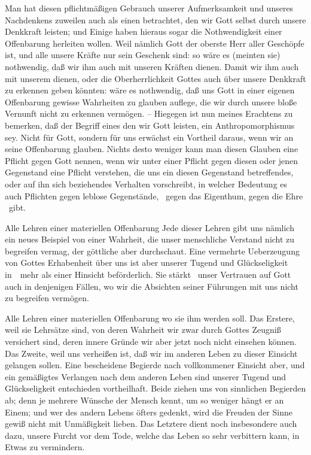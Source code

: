 \begin{aufza}
\begin{RWanm}  Man hat diesen pflichtmäßigen Gebrauch unserer Aufmerksamkeit und unseres Nachdenkens zuweilen auch als einen  betrachtet, den wir Gott selbst durch unsere Denkkraft leisten; und Einige haben hieraus sogar die Nothwendigkeit einer Offenbarung herleiten wollen. Weil nämlich Gott der oberste Herr aller Geschöpfe ist, und alle unsere Kräfte nur sein Geschenk sind: so wäre es (meinten sie) nothwendig, daß wir ihm auch mit  unseren Kräften dienen. Damit wir ihm auch mit unserem  dienen, oder die Oberherrlichkeit Gottes auch über unsere Denkkraft zu erkennen geben könnten: wäre es nothwendig, daß uns Gott in einer eigenen Offenbarung gewisse Wahrheiten zu glauben auflege, die wir durch unsere bloße Vernunft nicht zu erkennen vermögen. -- Hiegegen ist nun meines Erachtens zu bemerken, daß der Begriff eines  den wir Gott leisten, ein Anthropomorphismus sey. Nicht für Gott, sondern für uns erwächst ein Vortheil daraus, wenn wir an seine Offenbarung glauben. Nichts desto weniger kann man diesen Glauben eine Pflicht gegen Gott nennen, wenn wir unter einer Pflicht gegen diesen oder jenen Gegenstand eine Pflicht verstehen, die uns ein diesen Gegenstand betreffendes, oder auf ihn sich beziehendes Verhalten vorschreibt, in welcher Bedeutung es auch Pflichten gegen leblose Gegenstände, \zB\ gegen das Eigenthum, gegen die Ehre \udgl\  gibt.\end{RWanm}
\item Alle Lehren einer materiellen Offenbarung  Jede dieser Lehren gibt uns nämlich ein neues Beispiel von einer Wahrheit, die unser menschliche Verstand nicht zu begreifen vermag, der göttliche aber durchschaut. Eine vermehrte Ueberzeugung von Gottes Erhabenheit über uns ist aber unserer Tugend und Glückseligkeit in~\ mehr als einer Hinsicht beförderlich. Sie stärkt \zB\ unser Vertrauen auf Gott auch in denjenigen Fällen, wo wir die Absichten seiner Führungen mit uns nicht zu begreifen vermögen.
\item Alle Lehren einer materiellen Offenbarung  wo sie ihm werden soll. Das Erstere, weil sie Lehrsätze sind, von deren Wahrheit wir zwar durch Gottes Zeugniß versichert sind, deren innere Gründe wir aber jetzt noch nicht einsehen können. Das Zweite, weil uns verheißen ist, daß wir im anderen Leben zu dieser Einsicht gelangen sollen. Eine bescheidene Begierde nach vollkommener Einsicht aber, und ein gemäßigtes Verlangen nach dem anderen Leben sind unserer Tugend und Glückseligkeit entschieden vortheilhaft. Beide ziehen uns von sinnlichen Begierden ab; denn je mehrere Wünsche der Mensch kennt, um so weniger hängt er an Einem; und wer des andern Lebens öfters gedenkt, wird die Freuden der Sinne gewiß nicht mit Unmäßigkeit lieben. Das Letztere dient noch insbesondere auch dazu, unsere Furcht vor dem Tode, welche das Leben so sehr verbittern kann, in Etwas zu vermindern.

\end{aufza}
